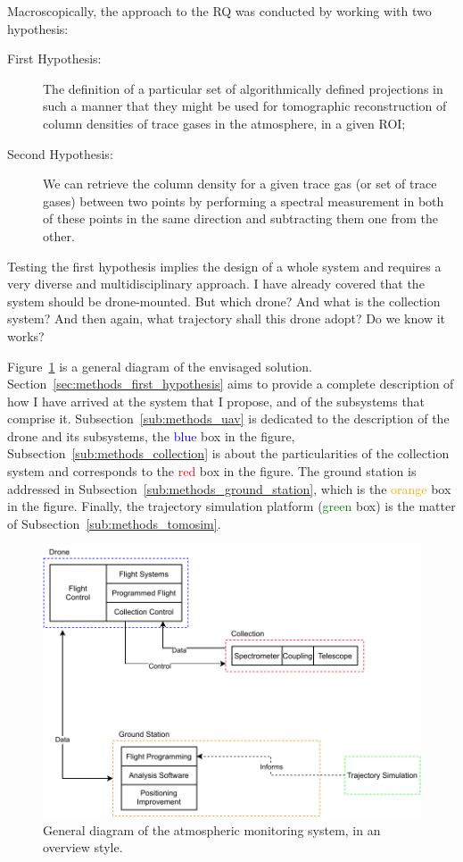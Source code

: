

Macroscopically, the approach to the \gls{RQ} was conducted by working
with two hypothesis:
\begin{description}
    \item[First Hypothesis:] The definition of a particular set of
        algorithmically defined projections in such a manner that they
        might be used for tomographic reconstruction of column densities
        of trace gases in the atmosphere, in a given \gls{ROI};
    \item[Second Hypothesis:] We can retrieve the column density for a
        given trace gas (or set of trace gases) between two points by
        performing a spectral measurement in both of these points in the
        same direction and subtracting them one from the other.
\end{description}

Testing the first hypothesis implies the design of a whole system and
requires a very diverse and multidisciplinary approach. I have already
covered that the system should be drone-mounted. But which drone? And
what is the collection system? And then again, what trajectory shall
this drone adopt? Do we know it works?

Figure~\ref{fig:general_system_schematic} is a general diagram of the
envisaged solution. Section~\ref{sec:methods_first_hypothesis} aims to
provide a complete description of how I have arrived at the system that
I propose, and of the subsystems that comprise it.
Subsection~\ref{sub:methods_uav} is dedicated to the description of the
drone and its subsystems, the \textcolor{blue}{blue} box in the figure,
Subsection~\ref{sub:methods_collection} is about the particularities of
the collection system and corresponds to the \textcolor{red}{red} box in
the figure. The ground station is addressed in
Subsection~\ref{sub:methods_ground_station}, which is the
\textcolor{orange}{orange} box in the figure. Finally, the trajectory
simulation platform (\textcolor{green}{green} box) is the matter of
Subsection~\ref{sub:methods_tomosim}.

\begin{figure}[htpb]
    \centering
    \includegraphics[width=.8\textwidth]{img/pdf/general_system_diagram.pdf}
    \caption{General diagram of the atmospheric monitoring system, in an
    overview style.}%
    \label{fig:general_system_schematic}
\end{figure}

